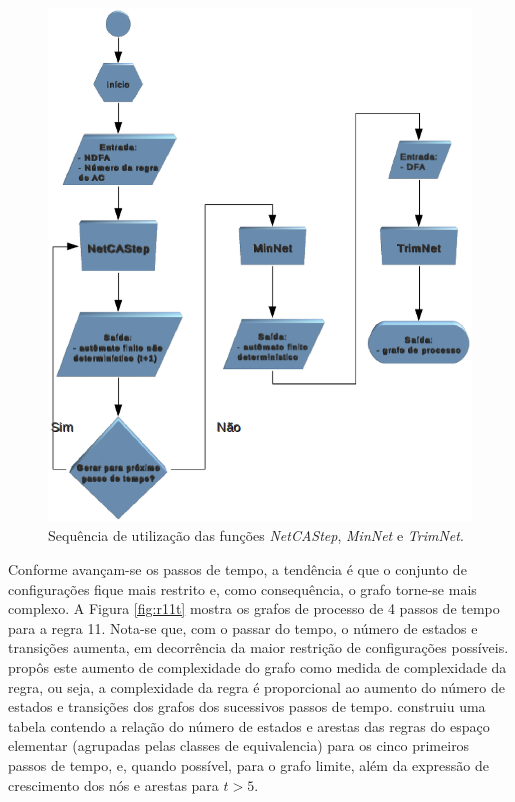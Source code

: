 \documentclass[12pt,a4paper]{article}
\begin{document}
\begin{figure}[htp]
\begin{center}
\includegraphics[scale=0.9]{img/net.eps}
\caption{Sequência de utilização das funções \emph{NetCAStep},
\emph{MinNet} e \emph{TrimNet}.}
\label{fig:net}
\end{center}
\end{figure}

Conforme avançam-se os passos de tempo, a tendência é que o conjunto de 
configurações fique mais restrito e, como consequência, o grafo torne-se
mais complexo. A Figura \ref{fig:r11t} mostra os grafos de processo de
4 passos de tempo para a regra 11. Nota-se que, com o passar do tempo,
o número de estados e transições aumenta, em decorrência da maior
restrição de configurações possíveis.  propôs
este aumento de complexidade do grafo como medida de complexidade da
regra, ou seja, a complexidade da regra é proporcional ao aumento do número
de estados e transições dos grafos dos sucessivos passos de tempo.
 construiu uma tabela contendo a relação
do número de estados e arestas das regras do espaço elementar
(agrupadas pelas classes de equivalencia) para os cinco primeiros
passos de tempo, e, quando possível, para o grafo limite, além da
expressão de crescimento dos nós e arestas para $t > 5$.
\end{document}
